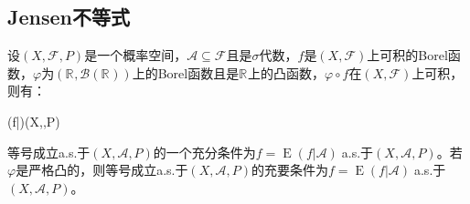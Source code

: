 \subsection{Jensen不等式}
\begin{theorem}
	设$(X,\mathscr{F},P)$是一个概率空间，$\mathscr{A}\subseteq\mathscr{F}$且是$\sigma$代数，$f$是$(X,\mathscr{F})$上可积的Borel函数，$\varphi$为$(\mathbb{R}^{},\mathcal{B}(\mathbb{R}^{}))$上的Borel函数且是$\mathbb{R}^{}$上的凸函数，$\varphi\circ f$在$(X,\mathscr{F})$上可积，则有：
	\begin{inequality*}\label{ineq:Jensen}
		\leqslant{}(\varphi\circ f|)\;(X,,P)
	\end{inequality*}
	等号成立a.s.于$(X,\mathscr{A},P)$的一个充分条件为$f=\operatorname{E}(f|\mathscr{A})\;$a.s.于$(X,\mathscr{A},P)$。若$\varphi$是严格凸的，则等号成立a.s.于$(X,\mathscr{A},P)$的充要条件为$f=\operatorname{E}(f|\mathscr{A})\;$a.s.于$(X,\mathscr{A},P)$。
\end{theorem}
